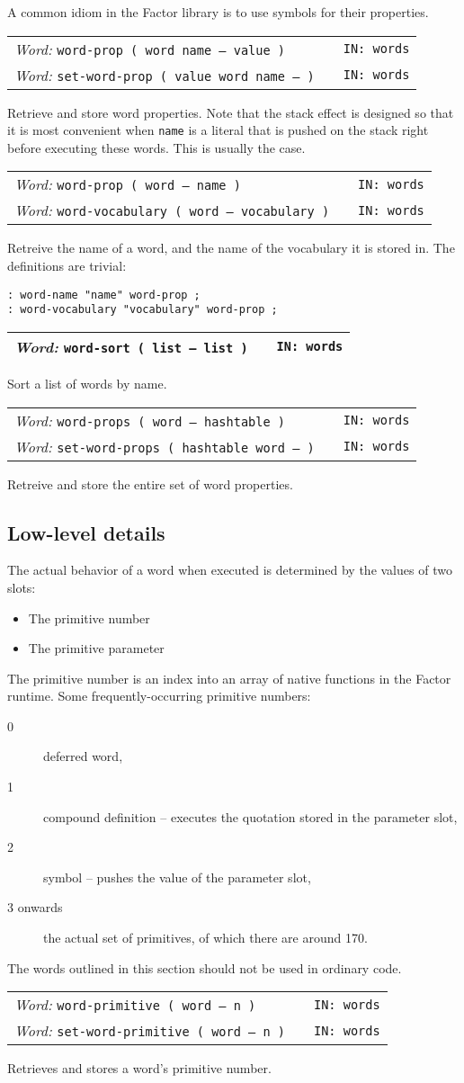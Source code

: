 \documentclass{report}
\newcommand{\ordinaryword}[3]{\index{#1}
\emph{Word:} \texttt{#2} &&\texttt{IN: #3}}
\newcommand{\wordtable}[1]{

\begin{tabularx}{12cm}[t]{lXr}
\hline
#1\\
\hline
\end{tabularx}

}
\begin{document}
A common idiom in the Factor library is to use symbols for their properties. 

\wordtable{
\ordinaryword{word-prop}{word-prop ( word name -- value )}{words}\\
\ordinaryword{set-word-prop}{set-word-prop ( value word name -- )}{words}
}
Retrieve and store word properties. Note that the stack effect is designed so that it is most convenient when \texttt{name} is a literal that is pushed on the stack right before executing these words. This is usually the case.

\wordtable{
\ordinaryword{word-name}{word-prop ( word -- name )}{words}\\
\ordinaryword{word-vocabulary}{word-vocabulary ( word -- vocabulary )}{words}
}
Retreive the name of a word, and the name of the vocabulary it is stored in. The definitions are trivial:
\begin{verbatim}
: word-name "name" word-prop ;
: word-vocabulary "vocabulary" word-prop ;
\end{verbatim}

\wordtable{
\ordinaryword{word-sort}{word-sort ( list -- list )}{words}
}
Sort a list of words by name.

\wordtable{
\ordinaryword{word-props}{word-props ( word -- hashtable )}{words}\\
\ordinaryword{set-word-props}{set-word-props ( hashtable word -- )}{words}
}
Retreive and store the entire set of word properties.

\subsection{Low-level details}

The actual behavior of a word when executed is determined by the values of two slots:
\begin{itemize}
\item The primitive number
\item The primitive parameter
\end{itemize}
The primitive number is an index into an array of native functions in the Factor runtime.
Some frequently-occurring primitive numbers:
\begin{description}
\item[0] deferred word,
\item[1] compound definition -- executes the quotation stored in the parameter slot,
\item[2] symbol -- pushes the value of the parameter slot,
\item[3 onwards] the actual set of primitives, of which there are around 170.
\end{description}
The words outlined in this section should not be used in ordinary code.
\wordtable{
\ordinaryword{word-primitive}{word-primitive ( word -- n )}{words}\\
\ordinaryword{set-word-primitive}{set-word-primitive ( word -- n )}{words}
}
Retrieves and stores a word's primitive number.
\end{document}
